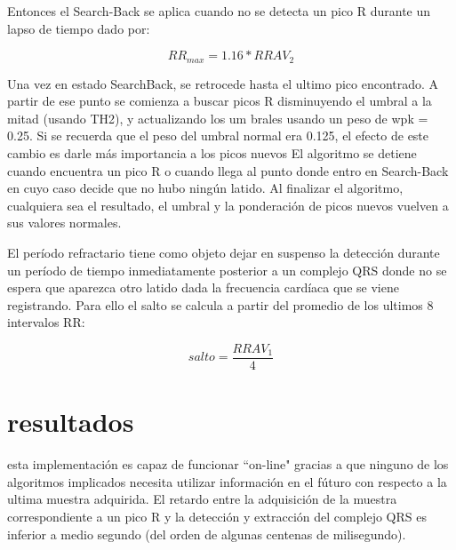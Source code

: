 \documentclass[%
        final,
        notitlepage,
        narroweqnarray,
        inline,
        ]{ieee}
\numberwithin{equation}{section}
\numberwithin{figure}{section}
\numberwithin{table}{section}
\begin{document}
Entonces el Search-Back se aplica cuando no se detecta un pico R durante un lapso de
tiempo dado por:

\begin{equation}
RR_{max}=1.16*RRAV_2
\end{equation}

Una vez en estado SearchBack, se retrocede hasta el ultimo pico encontrado. A partir de ese punto se comienza a buscar picos
R disminuyendo el umbral a la mitad (usando TH2), y actualizando los um
brales usando un peso de wpk = 0.25. Si se recuerda que el peso del umbral normal era
0.125, el efecto de este cambio es darle más importancia a los picos nuevos
El algoritmo se detiene cuando encuentra un pico R o cuando llega al punto donde entro
en Search-Back en cuyo caso decide que no hubo ningún latido. Al finalizar el algoritmo,
cualquiera sea el resultado, el umbral y la ponderación de picos nuevos vuelven a sus valores
normales.


El período refractario tiene como objeto dejar en suspenso la detección durante un
período de tiempo inmediatamente posterior a un complejo QRS donde no se espera que
aparezca otro latido dada la frecuencia cardíaca que se viene registrando. Para ello el salto
se calcula a partir del promedio de los ultimos 8 intervalos RR:

\begin{equation}
salto=\frac{RRAV_1}{4}
\end{equation}

\section{resultados}

esta implementación es capaz de funcionar ``on-line" gracias a que ninguno de los
algoritmos implicados necesita utilizar información en el fúturo con respecto a la ultima
muestra adquirida. El retardo entre la adquisición de la muestra correspondiente a un pico
R y la detección y extracción del complejo QRS es inferior a medio segundo (del orden de
algunas centenas de milisegundo).\\






\end{document}

